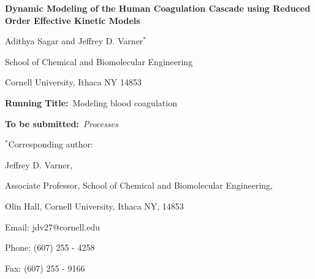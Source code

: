 \documentclass[12pt]{article}
\begin{document}
\begin{titlepage}
{\par\centering\textbf{\Large Dynamic Modeling of the Human Coagulation Cascade using Reduced Order Effective Kinetic Models}}
\vspace{0.05in}
{\par \centering \large{Adithya Sagar and Jeffrey D. Varner$^{*}$}}
\vspace{0.10in}
{\par \centering \large{School of Chemical and Biomolecular Engineering}}
{\par \centering \large{Cornell University, Ithaca NY 14853}}
\vspace{0.1in}
{\par \centering \textbf{Running Title:}~Modeling blood coagulation}
\vspace{0.1in}
{\par \centering \textbf{To be submitted:}~\emph{Processes}}
\vspace{0.5in}
{\par \centering $^{*}$Corresponding author:}
{\par \centering Jeffrey D. Varner,}
{\par \centering Associate Professor, School of Chemical and Biomolecular Engineering,}
{\par {} Olin Hall, Cornell University, Ithaca NY, 14853} 
{\par \centering Email: jdv27@cornell.edu} 
{\par \centering Phone: (607) 255 - 4258}
{\par \centering Fax: (607) 255 - 9166}
\end{titlepage}
\date{}
\thispagestyle{empty}
\pagebreak
\end{document}
